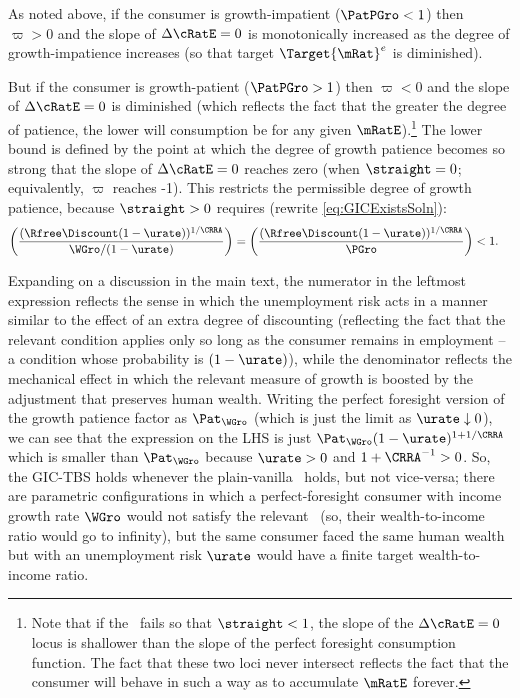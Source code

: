 \documentclass{\handout}
\begin{document}
As noted above, if the consumer is growth-impatient ($\PatPGro < 1$) then $\varpi > 0$ and the slope of $\dcEqZero$ is monotonically increased as the degree of growth-impatience increases (so that target $\Target{\mRat}^{e}$ is diminished).  

But if the consumer is growth-patient ($\PatPGro > 1$) then $\varpi < 0$ and the slope of $\dcEqZero$ is diminished (which reflects the fact that the greater the degree of patience, the lower will consumption be for any given $\mRatE$).\footnote{Note that if the \GICPGro~fails so that $\straight < 1$, the slope of the $\dcEqZero$ locus is shallower than the slope of the perfect foresight consumption function.  The fact that these two loci never intersect reflects the fact that the consumer will behave in such a way as to accumulate $\mRatE$ forever.}  The lower bound is defined by the point at which the degree of growth patience becomes so strong that the slope of $\dcEqZero$ reaches zero (when $\straight=0$; equivalently, $\varpi$ reaches -1).  This restricts the permissible degree of growth patience, because $\straight > 0$ requires (rewrite \eqref{eq:GICExistsSoln}):
\begin{equation}\begin{gathered}\begin{aligned}
  \left(\frac{(\Rfree \Discount (1-\urate))^{1/\CRRA}}{\WGro/(1-\urate)}\right) = \left(\frac{(\Rfree \Discount (1-\urate))^{1/\CRRA}}{\PGro}\right) & <  1
.\end{aligned}\end{gathered}\end{equation}

Expanding on a discussion in the main text, the numerator in the leftmost expression reflects the sense in which the unemployment risk acts in a manner similar to the effect of an extra degree of discounting (reflecting the fact that the relevant condition applies only so long as the consumer remains in employment -- a condition whose probability is $(1-\urate)$), while the denominator reflects the mechanical effect in which the relevant measure of growth is boosted by the adjustment that preserves human wealth.  Writing the perfect foresight version of the growth patience factor as $\Pat_{\WGro}$ (which is just the limit as $\urate \downarrow 0$), we can see that the expression on the LHS is just $\Pat_{\WGro}(1-\urate)^{1+1/\CRRA}$ which is smaller than $\Pat_{\WGro}$ because $\urate>0$ and $1+\CRRA^{-1} > 0$.  So, the GIC-TBS holds whenever the plain-vanilla \GICPGro~holds, but not vice-versa; there are parametric configurations in which a perfect-foresight consumer with income growth rate $\WGro$ would not satisfy the relevant \GICWGro~(so, their wealth-to-income ratio would go to infinity), but the same consumer faced the same human wealth but with an unemployment risk $\urate$ would have a finite target wealth-to-income ratio.  
\end{document}
